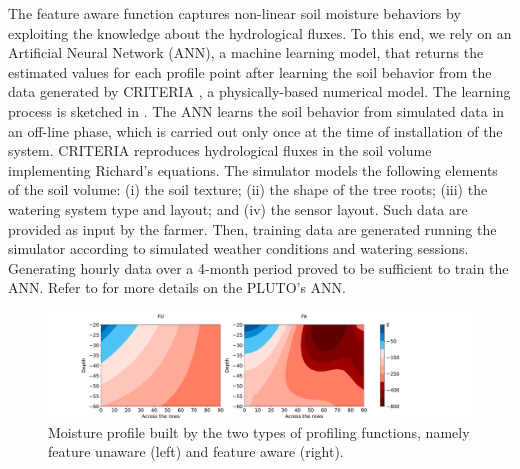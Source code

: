 The feature aware function captures non-linear soil moisture behaviors by exploiting the knowledge about the hydrological fluxes. To this end, we rely on an Artificial Neural Network (ANN), a machine learning model, that returns the estimated values for each profile point after learning the soil behavior from the data generated by CRITERIA \cite{Bittelli2011253}, a physically-based numerical model. 
The learning process is sketched in .
The ANN learns the soil behavior from simulated data in an off-line phase, which is carried out only once at the time of installation of the system.
CRITERIA reproduces hydrological fluxes in the soil volume implementing Richard's equations.
The simulator models the following elements of the soil volume: (i) the soil texture; (ii) the shape of the tree roots; (iii) the watering system type and layout; and (iv) the sensor layout.
Such data are provided as input by the farmer.
Then, training data are generated running the simulator according to simulated weather conditions and watering sessions.
Generating hourly data over a 4-month period proved to be sufficient to train the ANN. Refer to  for more details on the PLUTO's ANN. 


\begin{figure}[t]
\centering
\includegraphics[scale=.25]{chapters/physics-aware/pluto/img/countor_plot.pdf}
\caption{Moisture profile built by the two types of profiling functions, namely feature unaware (left) and feature aware (right).}
\label{pluto-fig:FU_FA}
\end{figure}

